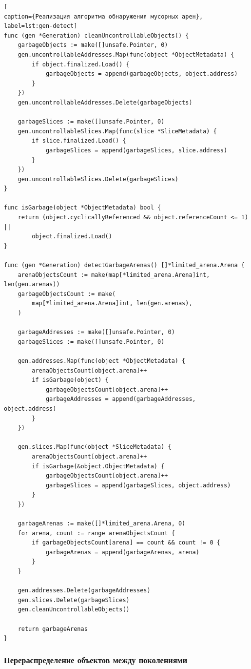 \begin{lstlisting}[
caption={Реализация алгоритма обнаружения мусорных арен},
label=lst:gen-detect]
func (gen *Generation) cleanUncontrollableObjects() {
	garbageObjects := make([]unsafe.Pointer, 0)
	gen.uncontrollableAddresses.Map(func(object *ObjectMetadata) {
		if object.finalized.Load() {
			garbageObjects = append(garbageObjects, object.address)
		}
	})
	gen.uncontrollableAddresses.Delete(garbageObjects)
	
	garbageSlices := make([]unsafe.Pointer, 0)
	gen.uncontrollableSlices.Map(func(slice *SliceMetadata) {
		if slice.finalized.Load() {
			garbageSlices = append(garbageSlices, slice.address)
		}
	})
	gen.uncontrollableSlices.Delete(garbageSlices)
}

func isGarbage(object *ObjectMetadata) bool {
	return (object.cyclicallyReferenced && object.referenceCount <= 1) || 
		object.finalized.Load()
}

func (gen *Generation) detectGarbageArenas() []*limited_arena.Arena {
	arenaObjectsCount := make(map[*limited_arena.Arena]int, len(gen.arenas))
	garbageObjectsCount := make(
		map[*limited_arena.Arena]int, len(gen.arenas),
	)
	
	garbageAddresses := make([]unsafe.Pointer, 0)
	garbageSlices := make([]unsafe.Pointer, 0)
	
	gen.addresses.Map(func(object *ObjectMetadata) {
		arenaObjectsCount[object.arena]++
		if isGarbage(object) {
			garbageObjectsCount[object.arena]++
			garbageAddresses = append(garbageAddresses, object.address)
		}
	})
	
	gen.slices.Map(func(object *SliceMetadata) {
		arenaObjectsCount[object.arena]++
		if isGarbage(&object.ObjectMetadata) {
			garbageObjectsCount[object.arena]++
			garbageSlices = append(garbageSlices, object.address)
		}
	})
	
	garbageArenas := make([]*limited_arena.Arena, 0)
	for arena, count := range arenaObjectsCount {
		if garbageObjectsCount[arena] == count && count != 0 {
			garbageArenas = append(garbageArenas, arena)
		}
	}
	
	gen.addresses.Delete(garbageAddresses)
	gen.slices.Delete(garbageSlices)
	gen.cleanUncontrollableObjects()
	
	return garbageArenas
}
\end{lstlisting}



\subsubsection{Перераспределение объектов между поколениями}

